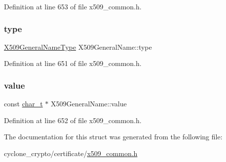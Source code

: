 Definition at line 653 of file x509\+\_\+common.\+h.

\mbox{\label{structX509GeneralName_a014e3358c1ab42d4da4cd2535d59f05f}} 
\subsubsection{\texorpdfstring{type}{type}}
{\footnotesize\ttfamily \hyperlink{certificate_2x509__common_8h_a6a82f43a61ee7a3e18d71f986d7f9a59}{X509\+General\+Name\+Type} X509\+General\+Name\+::type}



Definition at line 651 of file x509\+\_\+common.\+h.

\mbox{\label{structX509GeneralName_a00814b3509e1b708f019a645511e3d3a}} 
\subsubsection{\texorpdfstring{value}{value}}
{\footnotesize\ttfamily const \hyperlink{compiler__port_8h_a40bb5262bf908c328fbcfbe5d29d0201}{char\+\_\+t} $\ast$ X509\+General\+Name\+::value}



Definition at line 652 of file x509\+\_\+common.\+h.



The documentation for this struct was generated from the following file\+:\begin{DoxyCompactItemize}
\item 
cyclone\+\_\+crypto/certificate/\hyperlink{certificate_2x509__common_8h}{x509\+\_\+common.\+h}\end{DoxyCompactItemize}
